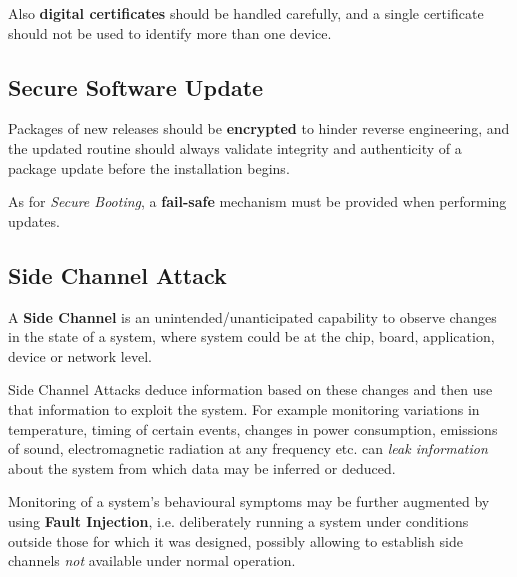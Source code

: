 Also \textbf{digital certificates} should be handled carefully, and a single certificate should not be used to identify more than one device.

\subsection{Secure Software Update}
Packages of new releases should be \textbf{encrypted} to hinder reverse engineering, and the
updated routine should always validate integrity and authenticity of a package update before the installation begins.

As for \textit{Secure Booting}, a \textbf{fail-safe} mechanism must be provided when performing updates.

\subsection{Side Channel Attack}
A \textbf{Side Channel} is an unintended/unanticipated capability to observe changes in the state
of a system, where system could be at the chip, board, application, device or network
level.

Side Channel Attacks deduce information based on these changes and then use that
information to exploit the system. 
For example monitoring variations in temperature,
timing of certain events, changes in power consumption, emissions of sound,
electromagnetic radiation at any frequency etc. can \textit{leak information} about the system
from which data may be inferred or deduced.

Monitoring of a system’s behavioural symptoms may be further augmented by using \textbf{Fault
Injection}, i.e. deliberately running a system under conditions outside those for which it was
designed, possibly allowing to establish side channels \textit{not} available under normal operation.